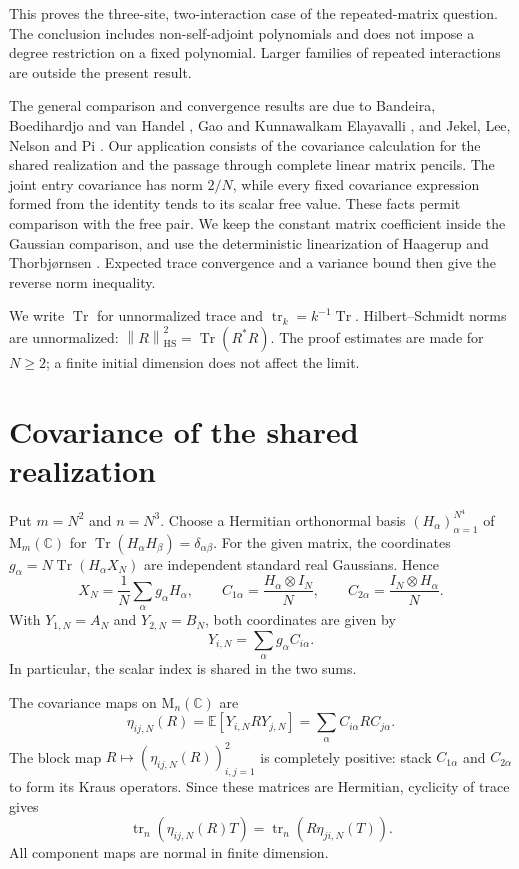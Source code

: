 \documentclass[11pt]{article}
\DeclareMathOperator{\Tr}{Tr}
\DeclareMathOperator{\tr}{tr}
\newcommand{\E}{\mathbb E}
\newcommand{\C}{\mathbb C}
\newcommand{\M}{\mathrm M}
\newcommand{\HS}{\mathrm{HS}}
\newcommand{\norm}[1]{\left\|#1\right\|}
\begin{document}
This proves the three-site, two-interaction case of the repeated-matrix
question. The conclusion includes non-self-adjoint polynomials and
does not impose a degree restriction on a fixed polynomial. Larger
families of repeated interactions are outside the present result.

The general comparison and convergence results are due to
Bandeira, Boedihardjo and van Handel \cite{BBvH}, Gao and
Kunnawalkam Elayavalli \cite{GK}, and Jekel, Lee, Nelson and Pi \cite{JLNP}.
Our application consists of the covariance calculation for the shared
realization and the passage through complete linear matrix pencils.
The joint entry covariance has norm $2/N$, while every fixed covariance
expression formed from the identity tends to its scalar free value.
These facts permit comparison with the free pair. We keep the constant
matrix coefficient inside the Gaussian comparison, and use the
deterministic linearization of Haagerup and Thorbj{\o}rnsen \cite{HT}.
Expected trace convergence and a variance bound then give the reverse
norm inequality.

We write $\Tr$ for unnormalized trace and $\tr_k=k^{-1}\Tr$.
Hilbert--Schmidt norms are unnormalized:
$\norm{R}_{\HS}^2=\Tr(R^*R)$. The proof estimates are made for $N\ge2$;
a finite initial dimension does not affect the limit.

\section{Covariance of the shared realization}

Put $m=N^2$ and $n=N^3$. Choose a Hermitian orthonormal basis
$(H_\alpha)_{\alpha=1}^{N^4}$ of $\M_m(\C)$ for
$\Tr(H_\alpha H_\beta)=\delta_{\alpha\beta}$.
For the given matrix, the coordinates
$g_\alpha=N\Tr(H_\alpha X_N)$ are independent standard real Gaussians.
Hence
\begin{equation}\label{eq:coefficients}
 X_N=\frac1N\sum_\alpha g_\alpha H_\alpha,\qquad
 C_{1\alpha}=\frac{H_\alpha\otimes I_N}{N},\qquad
 C_{2\alpha}=\frac{I_N\otimes H_\alpha}{N}.
\end{equation}
With $Y_{1,N}=A_N$ and $Y_{2,N}=B_N$, both coordinates are given by
\begin{equation}\label{eq:joint-gaussian}
 Y_{i,N}=\sum_\alpha g_\alpha C_{i\alpha}.
\end{equation}
In particular, the scalar index is shared in the two sums.

The covariance maps on $\M_n(\C)$ are
\[
 \eta_{ij,N}(R)=\E[Y_{i,N}RY_{j,N}]
             =\sum_\alpha C_{i\alpha}RC_{j\alpha}.
\]
The block map $R\mapsto(\eta_{ij,N}(R))_{i,j=1}^2$ is completely
positive: stack $C_{1\alpha}$ and $C_{2\alpha}$ to form its Kraus
operators. Since these matrices are Hermitian, cyclicity of trace gives
\begin{equation}\label{eq:trace-symmetry}
 \tr_n(\eta_{ij,N}(R)T)=\tr_n(R\eta_{ji,N}(T)).
\end{equation}
All component maps are normal in finite dimension.
\end{document}
